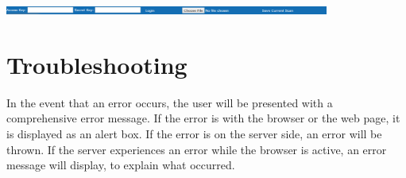\documentclass[hidelinks,a4paper,12pt]{article}
\begin{document}
	\begin{center}
		\includegraphics[width=0.8\textwidth]{./images/FileInteractions.png}
	\end{center}
				
					\newpage
							
								
	
	
\section{Troubleshooting}
	In the event that an error occurs, the user will be presented with a comprehensive error message. If the error is with the browser or the web page, it is displayed as an alert box. If the error is on the server side, an error will be thrown. If the server experiences an error while the browser is active, an error message will display, to explain what occurred.
		
\end{document}
